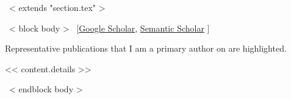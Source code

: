 ~< extends "section.tex" >~

~< block body >~
\vspace{-8.2mm}\hspace{30mm}
[\href{https://scholar.google.com/citations?user=<< scholar_id >>}{Google Scholar},
\href{https://www.semanticscholar.org/author/<< semantic_id >>}{Semantic Scholar}
]\vspace{3mm}


Representative publications that I am a primary author on are
\colorbox{tab_highlight}{highlighted.}




<< content.details >>

~< endblock body >~